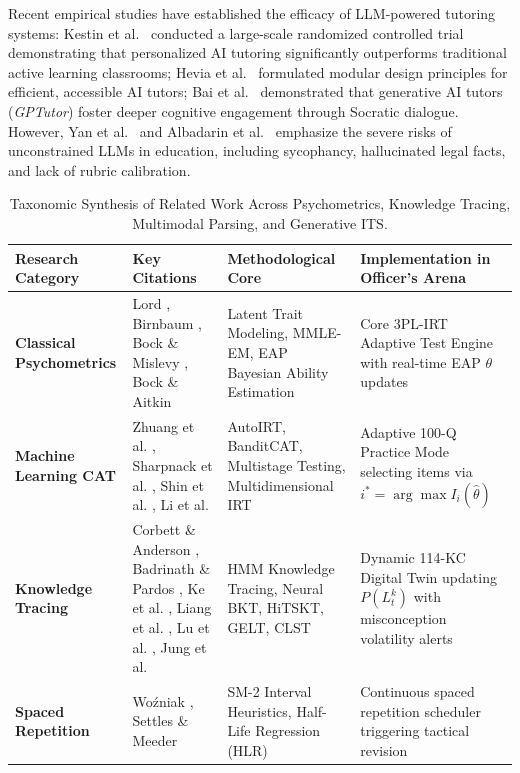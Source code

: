 \documentclass[conference]{IEEEtran}
\begin{document}
Recent empirical studies have established the efficacy of LLM-powered tutoring systems: Kestin et al.~\cite{Kestin2025} conducted a large-scale randomized controlled trial demonstrating that personalized AI tutoring significantly outperforms traditional active learning classrooms; Hevia et al.~\cite{Hevia2025} formulated modular design principles for efficient, accessible AI tutors; Bai et al.~\cite{Bai2025} demonstrated that generative AI tutors (\textit{GPTutor}) foster deeper cognitive engagement through Socratic dialogue. However, Yan et al.~\cite{Yan2024} and Albadarin et al.~\cite{Albadarin2024} emphasize the severe risks of unconstrained LLMs in education, including sycophancy, hallucinated legal facts, and lack of rubric calibration.

\begin{table}[t]
\centering
\caption{Taxonomic Synthesis of Related Work Across Psychometrics, Knowledge Tracing, Multimodal Parsing, and Generative ITS.}
\label{tab:literature_taxonomy}
\small
\begin{tabularx}{\textwidth}{lp{3.8cm}p{3.8cm}p{4.8cm}}
\toprule
\textbf{Research Category} & \textbf{Key Citations} & \textbf{Methodological Core} & \textbf{Implementation in Officer's Arena} \\
\midrule
\textbf{Classical Psychometrics} & Lord \cite{Lord1980}, Birnbaum \cite{Birnbaum1968}, Bock \& Mislevy \cite{BockMislevy1982}, Bock \& Aitkin \cite{BockAitkin1981} & Latent Trait Modeling, MMLE-EM, EAP Bayesian Ability Estimation & Core 3PL-IRT Adaptive Test Engine with real-time EAP $\theta$ updates \\
\textbf{Machine Learning CAT} & Zhuang et al. \cite{Zhuang2026}, Sharpnack et al. \cite{Sharpnack2024,Sharpnack2025}, Shin et al. \cite{Shin2025}, Li et al. \cite{Li2025} & AutoIRT, BanditCAT, Multistage Testing, Multidimensional IRT & Adaptive 100-Q Practice Mode selecting items via $i^* = \arg\max I_i(\hat{\theta})$ \\
\textbf{Knowledge Tracing} & Corbett \& Anderson \cite{CorbettAnderson1995}, Badrinath \& Pardos \cite{BadrinathPardos2025}, Ke et al. \cite{Ke2024}, Liang et al. \cite{Liang2024}, Lu et al. \cite{Lu2024}, Jung et al. \cite{Jung2025} & HMM Knowledge Tracing, Neural BKT, HiTSKT, GELT, CLST & Dynamic 114-KC Digital Twin updating $P(L_t^k)$ with misconception volatility alerts \\
\textbf{Spaced Repetition} & Woźniak \cite{Wozniak1990}, Settles \& Meeder \cite{SettlesMeeder2016} & SM-2 Interval Heuristics, Half-Life Regression (HLR) & Continuous spaced repetition scheduler triggering tactical revision \\

\end{tabularx}
\end{table}
\end{document}
